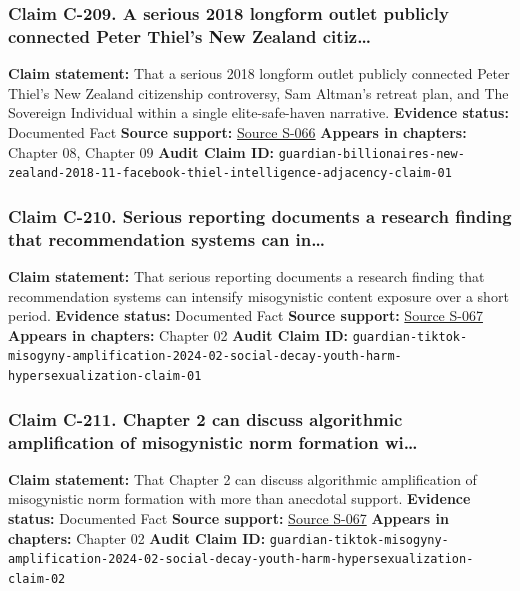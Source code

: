 \documentclass[
  american,
  11pt,
  letterpaper,
]{article}
\begin{document}
\subsubsection{Claim C-209. A serious 2018 longform outlet publicly
connected Peter Thiel's New Zealand
citiz\ldots{}}\label{claim-c-209-a-serious-2018-longform-outlet-publicly-connected-peter-thiel-s-new-zealand-citiz}

\textbf{Claim statement:} That a serious 2018 longform outlet publicly
connected Peter Thiel's New Zealand citizenship controversy, Sam
Altman's retreat plan, and The Sovereign Individual within a single
elite-safe-haven narrative. \textbf{Evidence status:} Documented Fact
\textbf{Source support:}
\hyperref[source-s-066-why-silicon-valley-billionaires-are-prepping-for-the-apocalypse-in-new-zealand]{Source
S-066} \textbf{Appears in chapters:} Chapter 08, Chapter 09
\textbf{Audit Claim ID:}
\texttt{guardian-billionaires-new-zealand-2018-11-facebook-thiel-intelligence-adjacency-claim-01}

\subsubsection{Claim C-210. Serious reporting documents a research
finding that recommendation systems can
in\ldots{}}\label{claim-c-210-serious-reporting-documents-a-research-finding-that-recommendation-systems-can-in}

\textbf{Claim statement:} That serious reporting documents a research
finding that recommendation systems can intensify misogynistic content
exposure over a short period. \textbf{Evidence status:} Documented Fact
\textbf{Source support:}
\hyperref[source-s-067-social-media-algorithms-amplifying-misogynistic-content]{Source
S-067} \textbf{Appears in chapters:} Chapter 02 \textbf{Audit Claim ID:}
\texttt{guardian-tiktok-misogyny-amplification-2024-02-social-decay-youth-harm-hypersexualization-claim-01}

\subsubsection{Claim C-211. Chapter 2 can discuss algorithmic
amplification of misogynistic norm formation
wi\ldots{}}\label{claim-c-211-chapter-2-can-discuss-algorithmic-amplification-of-misogynistic-norm-formation-wi}

\textbf{Claim statement:} That Chapter 2 can discuss algorithmic
amplification of misogynistic norm formation with more than anecdotal
support. \textbf{Evidence status:} Documented Fact \textbf{Source
support:}
\hyperref[source-s-067-social-media-algorithms-amplifying-misogynistic-content]{Source
S-067} \textbf{Appears in chapters:} Chapter 02 \textbf{Audit Claim ID:}
\texttt{guardian-tiktok-misogyny-amplification-2024-02-social-decay-youth-harm-hypersexualization-claim-02}
\end{document}
